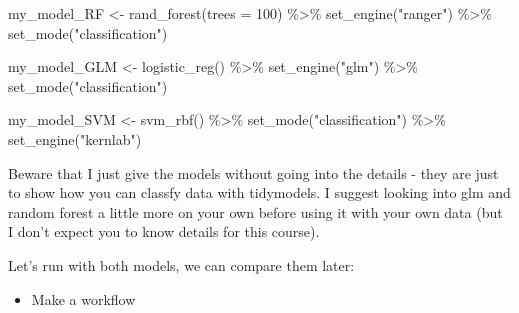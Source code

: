 \documentclass[
]{book}
\newenvironment{Shaded}{\begin{snugshade}}{\end{snugshade}}
\newcommand{\AttributeTok}[1]{\textcolor[rgb]{0.77,0.63,0.00}{#1}}
\newcommand{\DecValTok}[1]{\textcolor[rgb]{0.00,0.00,0.81}{#1}}
\newcommand{\FunctionTok}[1]{\textcolor[rgb]{0.00,0.00,0.00}{#1}}
\newcommand{\NormalTok}[1]{#1}
\newcommand{\OtherTok}[1]{\textcolor[rgb]{0.56,0.35,0.01}{#1}}
\newcommand{\SpecialCharTok}[1]{\textcolor[rgb]{0.00,0.00,0.00}{#1}}
\newcommand{\StringTok}[1]{\textcolor[rgb]{0.31,0.60,0.02}{#1}}
\providecommand{\tightlist}{%
  \setlength{\itemsep}{0pt}\setlength{\parskip}{0pt}}
\begin{document}
\begin{Shaded}
\begin{Highlighting}[]
\NormalTok{my\_model\_RF }\OtherTok{\textless{}{-}} \FunctionTok{rand\_forest}\NormalTok{(}\AttributeTok{trees =} \DecValTok{100}\NormalTok{) }\SpecialCharTok{\%\textgreater{}\%}
  \FunctionTok{set\_engine}\NormalTok{(}\StringTok{"ranger"}\NormalTok{) }\SpecialCharTok{\%\textgreater{}\%}
  \FunctionTok{set\_mode}\NormalTok{(}\StringTok{"classification"}\NormalTok{)}
\end{Highlighting}
\end{Shaded}

\begin{Shaded}
\begin{Highlighting}[]
\NormalTok{my\_model\_GLM }\OtherTok{\textless{}{-}} \FunctionTok{logistic\_reg}\NormalTok{() }\SpecialCharTok{\%\textgreater{}\%}
  \FunctionTok{set\_engine}\NormalTok{(}\StringTok{"glm"}\NormalTok{) }\SpecialCharTok{\%\textgreater{}\%}
  \FunctionTok{set\_mode}\NormalTok{(}\StringTok{"classification"}\NormalTok{)}
\end{Highlighting}
\end{Shaded}

\begin{Shaded}
\begin{Highlighting}[]
\NormalTok{my\_model\_SVM }\OtherTok{\textless{}{-}} \FunctionTok{svm\_rbf}\NormalTok{() }\SpecialCharTok{\%\textgreater{}\%}
  \FunctionTok{set\_mode}\NormalTok{(}\StringTok{"classification"}\NormalTok{) }\SpecialCharTok{\%\textgreater{}\%}
  \FunctionTok{set\_engine}\NormalTok{(}\StringTok{"kernlab"}\NormalTok{)}
\end{Highlighting}
\end{Shaded}

Beware that I just give the models without going into the details - they are just to show how you can classfy data with tidymodels. I suggest looking into glm and random forest a little more on your own before using it with your own data (but I don't expect you to know details for this course).

Let's run with both models, we can compare them later:

\begin{itemize}
\tightlist
\item
  Make a workflow
\end{itemize}
\end{document}
